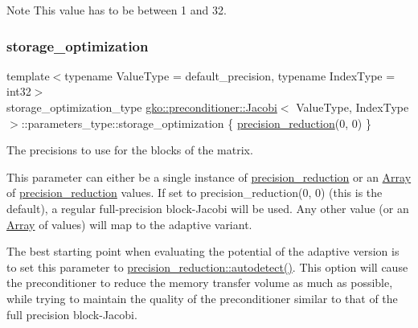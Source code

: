 \begin{DoxyNote}{Note}
This value has to be between 1 and 32. 
\end{DoxyNote}
\mbox{\label{structgko_1_1preconditioner_1_1Jacobi_1_1parameters__type_a51d0eec65f99d6dd5b0ebe5ba69390dd}} 
\subsubsection{\texorpdfstring{storage\+\_\+optimization}{storage\_optimization}}
{\footnotesize\ttfamily template$<$typename Value\+Type  = default\+\_\+precision, typename Index\+Type  = int32$>$ \\
storage\+\_\+optimization\+\_\+type \hyperlink{classgko_1_1preconditioner_1_1Jacobi}{gko\+::preconditioner\+::\+Jacobi}$<$ Value\+Type, Index\+Type $>$\+::parameters\+\_\+type\+::storage\+\_\+optimization \{ \hyperlink{classgko_1_1precision__reduction}{precision\+\_\+reduction}(0, 0) \}\hspace{0.3cm}{\ttfamily [mutable]}}



The precisions to use for the blocks of the matrix. 

This parameter can either be a single instance of \hyperlink{classgko_1_1precision__reduction}{precision\+\_\+reduction} or an \hyperlink{classgko_1_1Array}{Array} of \hyperlink{classgko_1_1precision__reduction}{precision\+\_\+reduction} values. If set to {\ttfamily precision\+\_\+reduction(0, 0)} (this is the default), a regular full-\/precision block-\/\+Jacobi will be used. Any other value (or an \hyperlink{classgko_1_1Array}{Array} of values) will map to the adaptive variant.

The best starting point when evaluating the potential of the adaptive version is to set this parameter to {\ttfamily \hyperlink{classgko_1_1precision__reduction_ac4109c61fadb24db7a1888c51ac483e9}{precision\+\_\+reduction\+::autodetect()}}. This option will cause the preconditioner to reduce the memory transfer volume as much as possible, while trying to maintain the quality of the preconditioner similar to that of the full precision block-\/\+Jacobi.

